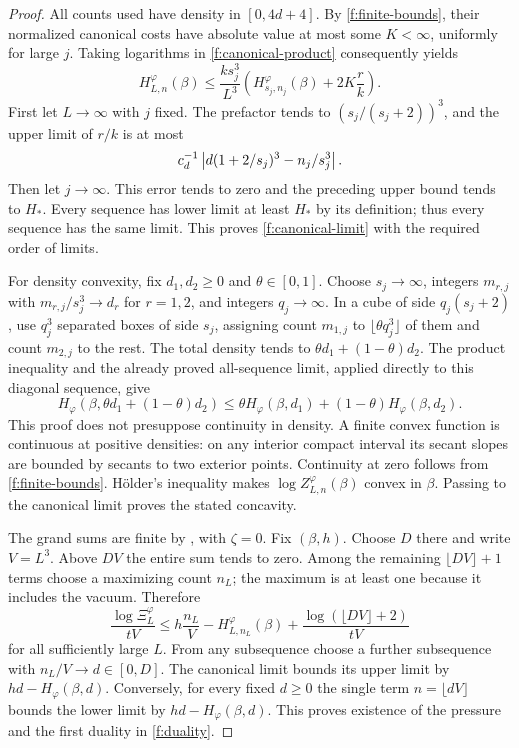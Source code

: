 \begin{proof}
All counts used have density in $[0,4d+4]$.  By
\eqref{f:finite-bounds}, their normalized canonical costs have absolute
value at most some $K<\infty$, uniformly for large $j$.  Taking
logarithms in \eqref{f:canonical-product} consequently yields
\[
 H^\varphi_{L,n}(\beta)
 \le\frac{ks_j^3}{L^3}
       \left(H^\varphi_{s_j,n_j}(\beta)+2K\frac rk\right).
\]
First let $L\to\infty$ with $j$ fixed.  The prefactor tends to
$(s_j/(s_j+2))^3$, and the upper limit of $r/k$ is at most
\[
 c_d^{-1}\left|d(1+2/s_j)^3-n_j/s_j^3\right|.
\]
Then let $j\to\infty$.  This error tends to zero and the preceding
upper bound tends to $H_*$.  Every sequence has lower limit at least
$H_*$ by its definition; thus every sequence has the same limit.
This proves \eqref{f:canonical-limit} with the required order of limits.

For density convexity, fix $d_1,d_2\ge0$ and $\theta\in[0,1]$.
Choose $s_j\to\infty$, integers $m_{r,j}$ with
$m_{r,j}/s_j^3\to d_r$ for $r=1,2$, and integers $q_j\to\infty$.
In a cube of side $q_j(s_j+2)$, use $q_j^3$ separated boxes of side
$s_j$, assigning count $m_{1,j}$ to $\lfloor\theta q_j^3\rfloor$
of them and count $m_{2,j}$ to the rest.  The total density tends to
$\theta d_1+(1-\theta)d_2$.  The product inequality and the already
proved all-sequence limit, applied directly to this diagonal sequence,
give
\[
 H_\varphi(\beta,\theta d_1+(1-\theta)d_2)
 \le\theta H_\varphi(\beta,d_1)
       +(1-\theta)H_\varphi(\beta,d_2).
\]
This proof does not presuppose continuity in density.  A finite convex
function is continuous at positive densities: on any interior compact
interval its secant slopes are bounded by secants to two exterior
points.  Continuity at zero follows from \eqref{f:finite-bounds}.
H\"older's inequality makes $\log Z^\varphi_{L,n}(\beta)$ convex in
$\beta$.  Passing to the canonical limit proves the stated concavity.

The grand sums are finite by , with $\zeta=0$.
Fix $(\beta,h)$.  Choose $D$ there and write $V=L^3$.  Above $DV$ the
entire sum tends to zero.  Among the remaining
$\lfloor DV\rfloor+1$ terms choose a maximizing count $n_L$; the
maximum is at least one because it includes the vacuum.  Therefore
\[
 \frac{\log\Xi^\varphi_L}{tV}
 \le h\frac{n_L}{V}-H^\varphi_{L,n_L}(\beta)
       +\frac{\log(\lfloor DV\rfloor+2)}{tV}
\]
for all sufficiently large $L$.  From any subsequence choose a further
subsequence with $n_L/V\to d\in[0,D]$.  The canonical limit bounds
its upper limit by $hd-H_\varphi(\beta,d)$.  Conversely, for every
fixed $d\ge0$ the single term $n=\lfloor dV\rfloor$ bounds the lower
limit by $hd-H_\varphi(\beta,d)$.  This proves existence of the
pressure and the first duality in \eqref{f:duality}.


\end{proof}
